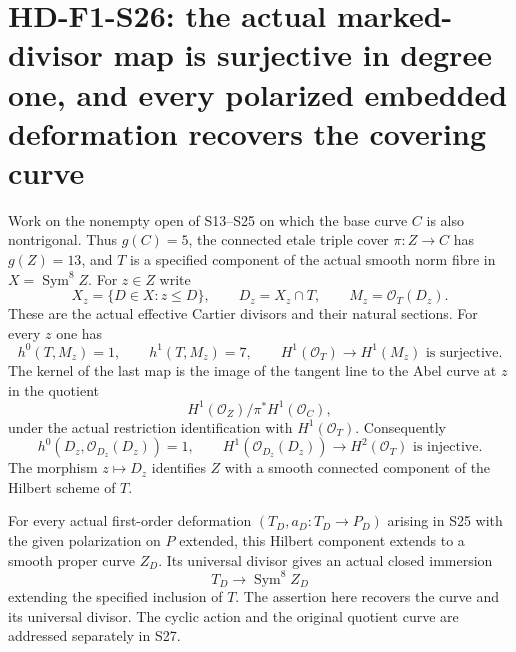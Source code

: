 \section[HD-F1-S26: marked-divisor cohomology and the recovered Hilbert curve]{HD-F1-S26: the actual marked-divisor map is surjective in degree one, and every polarized embedded deformation recovers the covering curve}
\label{sec:f1-norm-fourfold-marked-divisors}

Work on the nonempty open of S13--S25 on which the base curve
$C$ is also nontrigonal. Thus $g(C)=5$, the connected etale
triple cover $\pi:Z\to C$ has $g(Z)=13$, and
$T$ is a specified component of the actual smooth norm fibre
in $X=\operatorname{Sym}^8 Z$. For $z\in Z$ write
\[
 X_z=\{D\in X:z\leq D\},\qquad
 D_z=X_z\cap T,\qquad M_z=\mathcal O_T(D_z).
 \tag{F1S26.1}
\]
These are the actual effective Cartier divisors and their
natural sections. For every $z$ one has
\[
 h^0(T,M_z)=1,\qquad h^1(T,M_z)=7,
 \qquad H^1(\mathcal O_T)\longrightarrow H^1(M_z)
                         \text{ is surjective}.
 \tag{F1S26.2}
\]
The kernel of the last map is the image of the tangent line
to the Abel curve at $z$ in the quotient
\[
 H^1(\mathcal O_Z)/\pi^*H^1(\mathcal O_C),
\]
under the actual restriction identification with $H^1(\mathcal O_T)$.
Consequently
\[
 h^0(D_z,\mathcal O_{D_z}(D_z))=1,
 \qquad H^1(\mathcal O_{D_z}(D_z))\longrightarrow
                                      H^2(\mathcal O_T)
                         \text{ is injective}.
 \tag{F1S26.3}
\]
The morphism $z\mapsto D_z$ identifies $Z$ with a smooth
connected component of the Hilbert scheme of $T$.

For every actual first-order deformation $(T_D,a_D:T_D\to P_D)$
arising in S25 with the given polarization on $P$ extended,
this Hilbert component extends to a smooth proper curve $Z_D$.
Its universal divisor gives an actual closed immersion
\[
                   T_D\longrightarrow\operatorname{Sym}^8 Z_D
 \tag{F1S26.4}
\]
extending the specified inclusion of $T$. The assertion here
recovers the curve and its universal divisor. The cyclic action
and the original quotient curve are addressed separately in S27.

